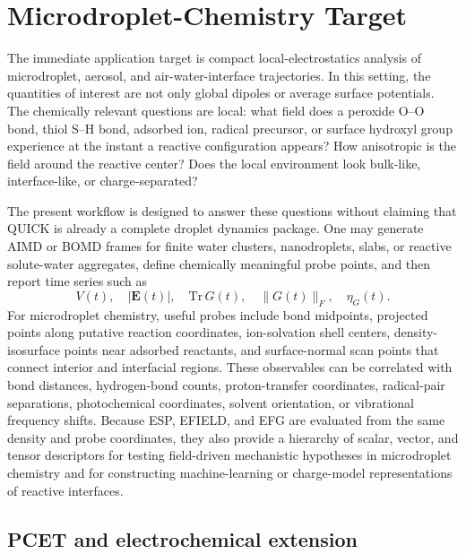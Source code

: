\documentclass[journal=jctcce,manuscript=article,email=false]{achemso}
\newcommand{\quick}{QUICK}
\begin{document}
\section{Microdroplet-Chemistry Target}

The immediate application target is compact local-electrostatics analysis
of microdroplet, aerosol, and air-water-interface trajectories.  In this
setting, the quantities of interest are not only global dipoles or average
surface potentials.  The chemically relevant questions are local: what
field does a peroxide O--O bond, thiol S--H bond, adsorbed ion, radical
precursor, or surface hydroxyl group experience at the instant a reactive
configuration appears?  How anisotropic is the field around the reactive
center?  Does the local environment look bulk-like, interface-like, or
charge-separated?

The present workflow is designed to answer these questions without
claiming that \quick{} is already a complete droplet dynamics package.
One may generate AIMD or BOMD frames for finite water clusters,
nanodroplets, slabs, or reactive solute-water aggregates, define
chemically meaningful probe points, and then report time series such as
\[
  V(t),\quad
  |\mathbf{E}(t)|,\quad
  \mathrm{Tr}\,G(t),\quad
  \|G(t)\|_F,\quad
  \eta_G(t).
\]
For microdroplet chemistry, useful probes include bond midpoints,
projected points along putative reaction coordinates, ion-solvation shell
centers, density-isosurface points near adsorbed reactants, and
surface-normal scan points that connect interior and interfacial regions.
These observables can be correlated with bond distances, hydrogen-bond
counts, proton-transfer coordinates, radical-pair separations,
photochemical coordinates, solvent orientation, or vibrational frequency
shifts.  Because ESP, EFIELD, and EFG are evaluated from the same density
and probe coordinates, they also provide a hierarchy of scalar, vector,
and tensor descriptors for testing field-driven mechanistic hypotheses in
microdroplet chemistry and for constructing machine-learning or
charge-model representations of reactive interfaces.

\subsection{PCET and electrochemical extension}
\end{document}
